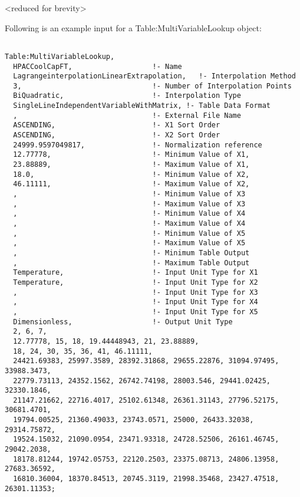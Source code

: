 \textless{}reduced for brevity\textgreater{}

Following is an example input for a Table:MultiVariableLookup object:

\begin{lstlisting}

Table:MultiVariableLookup,
  HPACCoolCapFT,                   !- Name
  LagrangeinterpolationLinearExtrapolation,   !- Interpolation Method
  3,                               !- Number of Interpolation Points
  BiQuadratic,                     !- Interpolation Type
  SingleLineIndependentVariableWithMatrix, !- Table Data Format
  ,                                !- External File Name
  ASCENDING,                       !- X1 Sort Order
  ASCENDING,                       !- X2 Sort Order
  24999.9597049817,                !- Normalization reference
  12.77778,                        !- Minimum Value of X1,
  23.88889,                        !- Maximum Value of X1,
  18.0,                            !- Minimum Value of X2,
  46.11111,                        !- Maximum Value of X2,
  ,                                !- Minimum Value of X3
  ,                                !- Maximum Value of X3
  ,                                !- Minimum Value of X4
  ,                                !- Maximum Value of X4
  ,                                !- Minimum Value of X5
  ,                                !- Maximum Value of X5
  ,                                !- Minimum Table Output
  ,                                !- Maximum Table Output
  Temperature,                     !- Input Unit Type for X1
  Temperature,                     !- Input Unit Type for X2
  ,                                !- Input Unit Type for X3
  ,                                !- Input Unit Type for X4
  ,                                !- Input Unit Type for X5
  Dimensionless,                   !- Output Unit Type
  2, 6, 7,
  12.77778, 15, 18, 19.44448943, 21, 23.88889,
  18, 24, 30, 35, 36, 41, 46.11111,
  24421.69383, 25997.3589, 28392.31868, 29655.22876, 31094.97495, 33988.3473,
  22779.73113, 24352.1562, 26742.74198, 28003.546, 29441.02425, 32330.1846,
  21147.21662, 22716.4017, 25102.61348, 26361.31143, 27796.52175, 30681.4701,
  19794.00525, 21360.49033, 23743.0571, 25000, 26433.32038, 29314.75872,
  19524.15032, 21090.0954, 23471.93318, 24728.52506, 26161.46745, 29042.2038,
  18178.81244, 19742.05753, 22120.2503, 23375.08713, 24806.13958, 27683.36592,
  16810.36004, 18370.84513, 20745.3119, 21998.35468, 23427.47518, 26301.11353;
\end{lstlisting}

